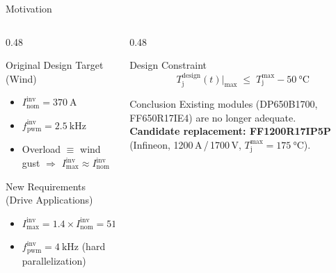 \documentclass[aspectratio=169, 10pt]{beamer}
\begin{document}
\begin{frame}{Motivation}
  \begin{columns}[T]
    \begin{column}{0.48\textwidth}
      \begin{block}{Original Design Target (Wind)}
        \begin{itemize}
          \item $I_\text{nom}^\text{inv} = \SI{370}{\ampere}$
          \item $f_\text{pwm}^\text{inv} = \SI{2.5}{\kilo\hertz}$
          \item Overload $\equiv$ wind gust $\Rightarrow$
                $I_\text{max}^\text{inv} \approx I_\text{nom}^\text{inv}$
        \end{itemize}
      \end{block}
      \vspace{4pt}
      \begin{alertblock}{New Requirements (Drive Applications)}
        \begin{itemize}
          \item $I_\text{max}^\text{inv} = 1.4\times I_\text{nom}^\text{inv}
                = \SI{518}{\ampere}$
          \item $f_\text{pwm}^\text{inv} = \SI{4}{\kilo\hertz}$ (hard parallelization)
        \end{itemize}
      \end{alertblock}
    \end{column}
    \begin{column}{0.48\textwidth}
      \begin{block}{Design Constraint}
        \[
          T_\text{j}^\text{design}(t)\Big|_\text{max}
          \;\le\;
          T_\text{j}^\text{max} - \SI{50}{\celsius}
        \]
      \end{block}
      \vspace{4pt}
      \begin{exampleblock}{Conclusion}
        Existing modules (DP650B1700, FF650R17IE4) are no longer adequate.\\[4pt]
        \textbf{Candidate replacement: FF1200R17IP5P} (Infineon,
        1200\,A\,/\,1700\,V, $T_\text{j}^\text{max}=\SI{175}{\celsius}$).
      \end{exampleblock}
    \end{column}
  \end{columns}
\end{frame}

\end{document}
